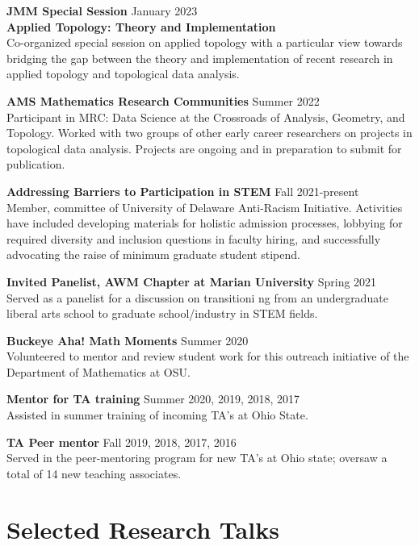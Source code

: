 \documentclass[10pt,letterpaper]{article}
\renewenvironment{itemize}{
  \begin{list}{}{
    \setlength{\leftmargin}{1.5em}
    \setlength{\itemsep}{0.25em}
    \setlength{\parskip}{0pt}
    \setlength{\parsep}{0.25em}
  }
}{
  \end{list}
}
\begin{document}
\begin{itemize}
\item{\bf JMM Special Session} \hfill January 2023\\{\bf Applied Topology: Theory and Implementation}\\
{Co-organized special session on applied topology with a particular view towards bridging the gap between the theory and implementation of recent research in applied topology and topological data analysis.}
\item {\bf AMS Mathematics Research Communities} \hfill Summer 2022\\
{Participant in MRC: Data Science at the Crossroads of Analysis, Geometry, and Topology. Worked with two groups of other early career researchers on projects in topological data analysis. Projects are ongoing and in preparation to submit for publication.}
\item {\bf Addressing Barriers to Participation in STEM} \hfill Fall 2021-present\\
{Member, committee of University of Delaware Anti-Racism Initiative. Activities have included developing materials for holistic admission processes, lobbying for required diversity and inclusion questions in faculty hiring, and successfully advocating the raise of minimum graduate student stipend.}
\item{\bf Invited Panelist, AWM Chapter at Marian University} \hfill Spring 2021\\
{Served as a panelist for a discussion on transitioni ng from an undergraduate liberal arts school to graduate school/industry in STEM fields.}
\item {\bf Buckeye Aha! Math Moments} \hfill Summer 2020 \\
  {Volunteered to mentor and review student work for this outreach initiative of the Department of Mathematics at OSU.}
\item {\bf Mentor for TA training}
  \hfill Summer 2020, 2019, 2018, 2017 \\
  {Assisted in summer training of incoming TA's at Ohio State. }
\item {\bf TA Peer mentor} \hfill Fall 2019, 2018, 2017, 2016 \\
  {Served in the peer-mentoring program for new TA's at Ohio state; oversaw a total of 14 new teaching associates.}

\end{itemize}

\section*{Selected Research Talks}
\end{document}
